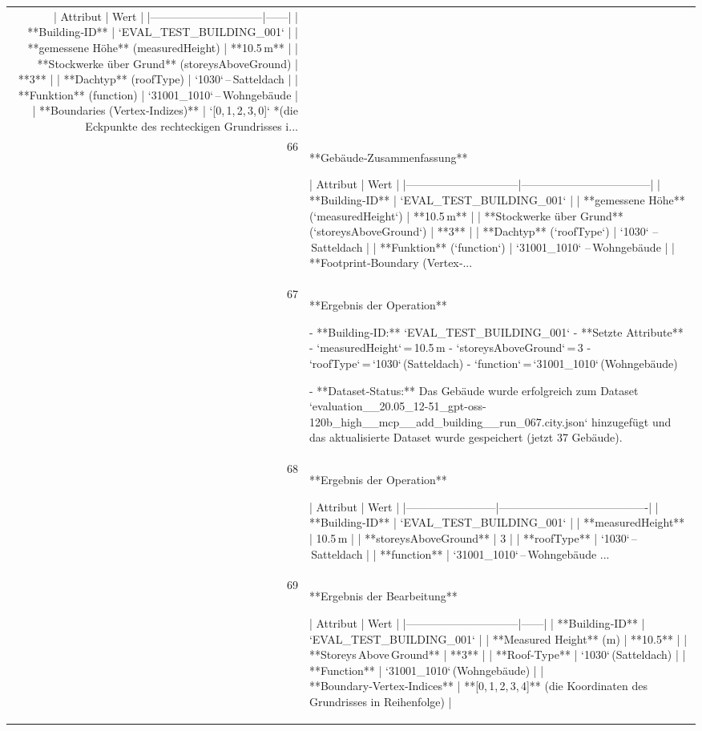 \documentclass[a4paper,11pt]{article}
\begin{document}
\begin{table}[ht]
\begin{tabular}{r p{12cm}}
| Attribut                     | Wert |
|------------------------------|------|
| **Building‑ID**              | `EVAL\_TEST\_BUILDING\_001` |
| **gemessene Höhe** (measuredHeight) | **10.5 m** |
| **Stockwerke über Grund** (storeysAboveGround) | **3** |
| **Dachtyp** (roofType)       | `1030` – Satteldach |
| **Funktion** (function)      | `31001\_1010` – Wohngebäude |
| **Boundaries (Vertex‑Indizes)** | `[0, 1, 2, 3, 0]`  *(die Eckpunkte des rechteckigen Grundrisses i... \\
66 & **Gebäude‑Zusammenfassung**

| Attribut                     | Wert                              |
|------------------------------|-----------------------------------|
| **Building‑ID**              | `EVAL\_TEST\_BUILDING\_001`          |
| **gemessene Höhe** (`measuredHeight`) | **10.5 m** |
| **Stockwerke über Grund** (`storeysAboveGround`) | **3** |
| **Dachtyp** (`roofType`)     | `1030` – Satteldach |
| **Funktion** (`function`)    | `31001\_1010` – Wohngebäude |
| **Footprint‑Boundary (Vertex‑... \\
67 & **Ergebnis der Operation**

- **Building‑ID:** `EVAL\_TEST\_BUILDING\_001`  
- **Setzte Attribute**
  - `measuredHeight` = 10.5 m  
  - `storeysAboveGround` = 3  
  - `roofType` = `1030` (Satteldach)  
  - `function` = `31001\_1010` (Wohngebäude)  

- **Dataset‑Status:** Das Gebäude wurde erfolgreich zum Dataset `evaluation\_\_20.05\_12-51\_gpt-oss-120b\_high\_\_mcp\_\_add\_building\_\_run\_067.city.json` hinzugefügt und das aktualisierte Dataset wurde gespeichert (jetzt 37 Gebäude). \\
68 & **Ergebnis der Operation**

| Attribut                | Wert                                   |
|------------------------|----------------------------------------|
| **Building‑ID**        | `EVAL\_TEST\_BUILDING\_001`                |
| **measuredHeight**     | 10.5 m                                 |
| **storeysAboveGround** | 3                                      |
| **roofType**           | `1030` – Satteldach                     |
| **function**           | `31001\_1010` – Wohngebäude        ... \\
69 & **Ergebnis der Bearbeitung**

| Attribut                     | Wert |
|------------------------------|------|
| **Building‑ID**              | `EVAL\_TEST\_BUILDING\_001` |
| **Measured Height** (m)      | **10.5** |
| **Storeys Above Ground**     | **3** |
| **Roof‑Type**                | `1030` (Satteldach) |
| **Function**                 | `31001\_1010` (Wohngebäude) |
| **Boundary‑Vertex‑Indices**  | **[0, 1, 2, 3, 4]** (die Koordinaten des Grundrisses in Reihenfolge) |


\end{tabular}
\end{table}
\end{document}
